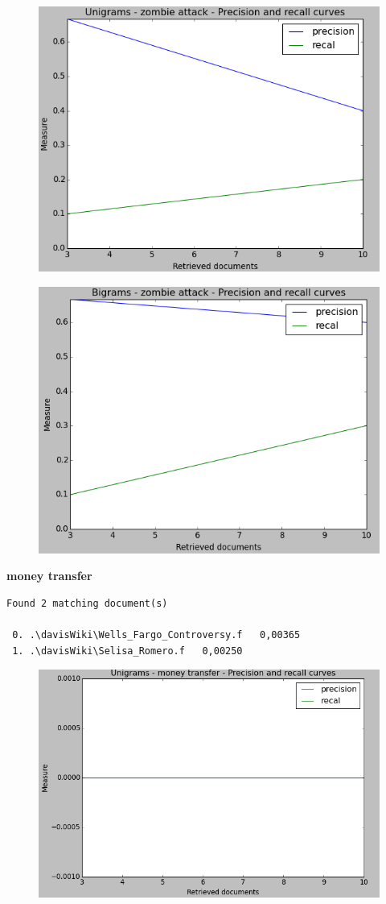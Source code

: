 \begin{figure}[H]
\centering 
\includegraphics[width=0.7\linewidth]{img/unigrams1.png}
\end{figure}

\begin{figure}[H]
\centering 
\includegraphics[width=0.7\linewidth]{img/bigrams1.png}
\end{figure}

\textbf{money transfer}

\begin{verbatim}
Found 2 matching document(s)

 0. .\davisWiki\Wells_Fargo_Controversy.f   0,00365
 1. .\davisWiki\Selisa_Romero.f   0,00250
\end{verbatim}

\begin{figure}[H]
\centering 
\includegraphics[width=0.7\linewidth]{img/unigrams2.png}
\end{figure}

